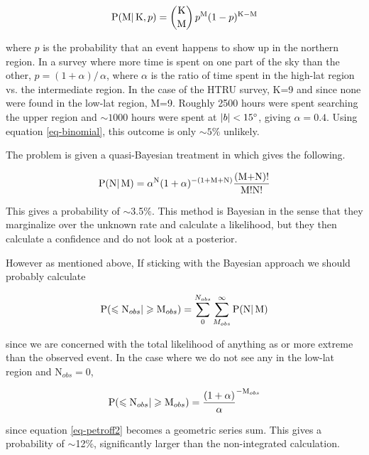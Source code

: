 \documentclass[useAMS,usenatbib]{mn2e}
\begin{document}
\begin{equation}
\label{eq-binomial}
\textup{P(M} | \,\textup{K}, p) =  \binom{\textup{K}}{\textup{M}} \, p^{\textup{M}} (1-p)^{\textup{K}-\textup{M}} 
\end{equation}

\noindent where $p$ is the probability that an event happens to show up in the 
northern region. In a survey where more time is spent on one part of the 
sky than the other, $p=(1 + \alpha)/\, \alpha$, where $\alpha$ is the ratio of 
time spent in the high-lat region vs. the intermediate region. In the case of the HTRU 
survey, K=9 and since none were found 
in the low-lat region, M=9. Roughly 2500 hours were spent searching the upper region
and $\sim1000$ hours were spent at $|b| < 15\degree$, giving $\alpha=0.4$. Using equation 
\ref{eq-binomial}, this outcome is only $\sim5\%$ unlikely. 

The problem is given a quasi-Bayesian treatment in 
\cite{2014ApJ...789L..26P} which gives the following.

\begin{equation}
\label{eq-petroff}
\textup{P(N} | \,\textup{M}) =  \alpha^{\textup{N}} (1 + \alpha)^{-(1+\textup{M+N})} \frac{(\textup{M+N})!}{\textup{M!N!}}
\end{equation}

\noindent This gives a probability of $\sim$3.5$\%$. This method 
is Bayesian in the sense that they marginalize over the unknown rate 
and calculate a likelihood, but they then calculate a confidence 
and do not look at a posterior.  

However as mentioned 
above, If sticking with the Bayesian 
approach we should probably calculate

\begin{equation} 
\label{eq-petroff2}
\textup{P}(\le \textup{N}_{obs} | \ge \textup{M}_{obs}) = \sum_{0}^{N_{obs}} \sum_{M_{obs}}^\infty \textup{P(N} | \,\textup{M})
\end{equation} 

\noindent since we are concerned with the total likelihood of anything as or more 
extreme than the observed event. In the case where we do not see any in the low-lat 
region and N$_{obs}=0$, 

\begin{equation}
\textup{P}(\le \textup{N}_{obs} | \ge \textup{M}_{obs})=\frac{(1+\alpha)}{\alpha}^{-\textup{M}_{obs}}
\end{equation}

\noindent since equation \ref{eq-petroff2} becomes a geometric series sum. 
This gives a probability of $\sim$12$\%$, significantly larger than the non-integrated
calculation. 
\end{document}
